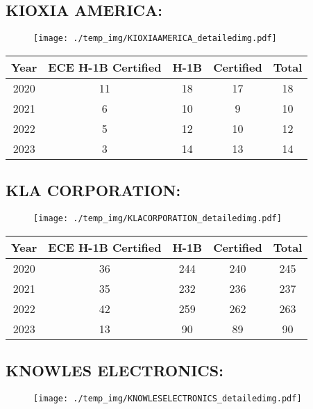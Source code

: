 \documentclass{article}%
\begin{document}
%
\newpage%
\subsection{KIOXIA AMERICA:}%
\label{subsec:KIOXIAAMERICA}%
\label{KIOXIAAMERICAdetailed}%


\begin{figure}[htbp]%
\centering%
\texttt{[image: ./temp\_img/KIOXIAAMERICA\_detailedimg.pdf]}%
\end{figure}

%
\begin{longtable}{c|c|c|c|c}%
\hline%
Year&ECE H{-}1B Certified&H{-}1B&Certified&Total\\%
\hline%
2020&11&18&17&18\\%
\hline%
2021&6&10&9&10\\%
\hline%
2022&5&12&10&12\\%
\hline%
2023&3&14&13&14\\%
\hline%
\end{longtable}

%
\newpage%
\subsection{KLA CORPORATION:}%
\label{subsec:KLACORPORATION}%
\label{KLACORPORATIONdetailed}%


\begin{figure}[htbp]%
\centering%
\texttt{[image: ./temp\_img/KLACORPORATION\_detailedimg.pdf]}%
\end{figure}

%
\begin{longtable}{c|c|c|c|c}%
\hline%
Year&ECE H{-}1B Certified&H{-}1B&Certified&Total\\%
\hline%
2020&36&244&240&245\\%
\hline%
2021&35&232&236&237\\%
\hline%
2022&42&259&262&263\\%
\hline%
2023&13&90&89&90\\%
\hline%
\end{longtable}

%
\newpage%
\subsection{KNOWLES ELECTRONICS:}%
\label{subsec:KNOWLESELECTRONICS}%
\label{KNOWLESELECTRONICSdetailed}%


\begin{figure}[htbp]%
\centering%
\texttt{[image: ./temp\_img/KNOWLESELECTRONICS\_detailedimg.pdf]}%
\end{figure}
\end{document}
